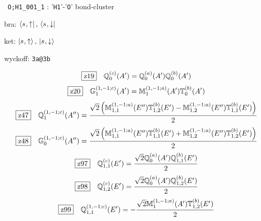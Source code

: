 \documentclass[fleqn,10pt,landscape]{jsarticle}
\begin{document}
\noindent\textbullet\, \texttt{O;H1_001_1} : '\texttt{H1}'-'\texttt{O}' bond-cluster

\noindent\quad * bra: $\bra{s_{},\uparrow},\, \bra{s_{},\downarrow}$

\noindent\quad * ket: $\ket{s_{},\uparrow},\, \ket{s_{},\downarrow}$

\noindent\quad * wyckoff: \texttt{3a@3b}

\begin{dmath*}
\hspace*{3mm}\fbox{z19}\quad \mathbb{Q}_{0}^{(c)}(A^{\prime})=\mathbb{Q}_{0}^{(a)}(A^{\prime}) \mathbb{Q}_{0}^{(b)}(A^{\prime})
\end{dmath*}
\begin{dmath*}
\hspace*{3mm}\fbox{z20}\quad \mathbb{G}_{1}^{(1,-1;c)}(A^{\prime})=\mathbb{M}_{1}^{(1,-1;a)}(A^{\prime}) \mathbb{T}_{0}^{(b)}(A^{\prime})
\end{dmath*}
\begin{dmath*}
\hspace*{3mm}\fbox{z47}\quad \mathbb{Q}_{1}^{(1,-1;c)}(A^{\prime\prime})=\frac{\sqrt{2} \left(\mathbb{M}_{1,1}^{(1,-1;a)}(E^{\prime\prime}) \mathbb{T}_{1,2}^{(b)}(E^{\prime}) - \mathbb{M}_{1,2}^{(1,-1;a)}(E^{\prime\prime}) \mathbb{T}_{1,1}^{(b)}(E^{\prime})\right)}{2}
\end{dmath*}
\begin{dmath*}
\hspace*{3mm}\fbox{z48}\quad \mathbb{G}_{0}^{(1,-1;c)}(A^{\prime\prime})=\frac{\sqrt{2} \left(\mathbb{M}_{1,1}^{(1,-1;a)}(E^{\prime\prime}) \mathbb{T}_{1,1}^{(b)}(E^{\prime}) + \mathbb{M}_{1,2}^{(1,-1;a)}(E^{\prime\prime}) \mathbb{T}_{1,2}^{(b)}(E^{\prime})\right)}{2}
\end{dmath*}
\begin{dmath*}
\hspace*{3mm}\fbox{z97}\quad \mathbb{Q}_{1,1}^{(c)}(E^{\prime})=\frac{\sqrt{2} \mathbb{Q}_{0}^{(a)}(A^{\prime}) \mathbb{Q}_{1,1}^{(b)}(E^{\prime})}{2}
\end{dmath*}
\begin{dmath*}
\hspace*{3mm}\fbox{z98}\quad \mathbb{Q}_{1,2}^{(c)}(E^{\prime})=\frac{\sqrt{2} \mathbb{Q}_{0}^{(a)}(A^{\prime}) \mathbb{Q}_{1,2}^{(b)}(E^{\prime})}{2}
\end{dmath*}
\begin{dmath*}
\hspace*{3mm}\fbox{z99}\quad \mathbb{Q}_{1,1}^{(1,-1;c)}(E^{\prime})=- \frac{\sqrt{2} \mathbb{M}_{1}^{(1,-1;a)}(A^{\prime}) \mathbb{T}_{1,2}^{(b)}(E^{\prime})}{2}
\end{dmath*}
\end{document}

